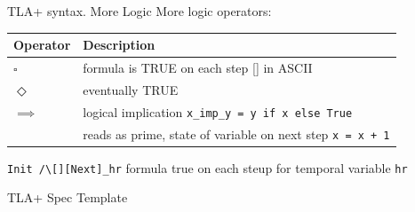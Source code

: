 \documentclass[12pt]{beamer}
\begin{document}
  \begin{frame}{TLA+ syntax. More Logic}
      More logic operators:
        \begin{table}
        \centering
            \begin{tabular}{@{} lp{9cm} @{}}
                Operator   & Description   \\ \hline
                $\square$  & formula is TRUE on each step [] in ASCII   \\
                $\Diamond$ & eventually TRUE \\
                $\implies$ & logical implication \texttt{x_imp_y = y if x else True}\\
                \boxed{$'$}& reads as prime, state of variable on next step \texttt{x = x + 1}
            \end{tabular}
        \end{table}
            \texttt{Init /\textbackslash [][Next]\_hr} formula true on each steup for temporal variable \texttt{hr}
  \end{frame}
  \begin{frame}{TLA+ Spec Template}
      \begin{center}
          \inputminted[linenos, fontsize=\scriptsize]{tla}{figures/template.tla}
      \end{center}
  \end{frame}
\end{document}
